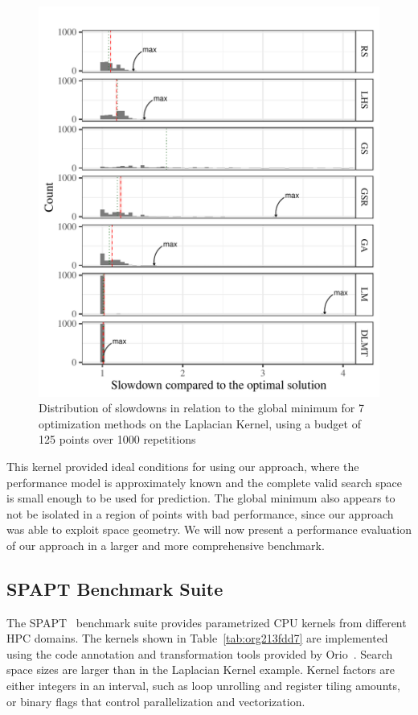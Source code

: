 \documentclass[conference]{IEEEtran}
\begin{document}
\begin{figure}[t]\vspace{-.5cm}
\centering
\includegraphics[width=.9\columnwidth]{./img/comparison_histogram.pdf}
\caption{\label{fig:orgca76177}
Distribution of slowdowns in relation to the global minimum for 7 optimization methods on the Laplacian Kernel, using a budget of 125 points over 1000 repetitions \vspace{-.5cm}}
\end{figure}

This kernel provided ideal conditions for using our approach, where the
performance model is approximately known and the complete valid search space is
small enough to be used for prediction. The global minimum also appears to not
be isolated in a region of points with bad performance, since our approach was
able to exploit space geometry. We will now present a performance evaluation of
our approach in a larger and more comprehensive benchmark.
\subsection{SPAPT Benchmark Suite}
\label{sec:org6bb0780}
The SPAPT~\cite{balaprakash2012spapt} benchmark suite provides
parametrized CPU kernels from different HPC domains. The kernels shown in
Table~\ref{tab:org213fdd7} are implemented using the code annotation and
transformation tools provided by Orio~\cite{hartono2009annotation}. Search
space sizes are larger than in the Laplacian Kernel example. Kernel factors are
either integers in an interval, such as loop unrolling and register tiling
amounts, or binary flags that control parallelization and vectorization.
\end{document}
